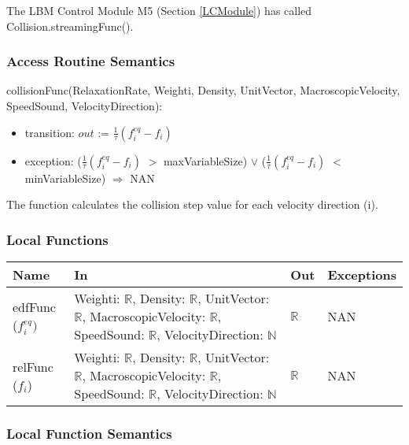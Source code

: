 \documentclass[12pt, titlepage]{article}
\begin{document}
The LBM Control Module M5 (Section \ref{LCModule}) has called Collision.streamingFunc().

\subsubsection{Access Routine Semantics}

\noindent collisionFunc(RelaxationRate, Weighti, Density, UnitVector, MacroscopicVelocity, SpeedSound, VelocityDirection):
\begin{itemize}
	\item transition: $out$ := $\frac{1}{\tau}(f_{i}^{eq}-f_{i})$
	\item exception: ($\frac{1}{\tau}(f_{i}^{eq}-f_{i})$ $>$ maxVariableSize) $\lor$ ($\frac{1}{\tau}(f_{i}^{eq}-f_{i})$ $<$ minVariableSize) $\Rightarrow$ NAN
\end{itemize}


The function calculates the collision step value for each velocity direction (i).

\subsubsection{Local Functions}

\begin{center}
	\begin{tabular}{p{2cm} p{3cm} p{4cm} p{2cm}}
		\hline
		\textbf{Name} & \textbf{In} & \textbf{Out} & \textbf{Exceptions} \\
		\hline
		edfFunc ($f_{i}^{eq})$ & Weighti: $\mathbb{R}$, Density: $\mathbb{R}$, UnitVector: $\mathbb{R}$, MacroscopicVelocity: $\mathbb{R}$, SpeedSound: $\mathbb{R}$, VelocityDirection: $\mathbb{N}$ & $\mathbb{R}$ & NAN \\
		relFunc ($f_{i}$) & Weighti: $\mathbb{R}$, Density: $\mathbb{R}$, UnitVector: $\mathbb{R}$, MacroscopicVelocity: $\mathbb{R}$, SpeedSound: $\mathbb{R}$, VelocityDirection: $\mathbb{N}$ & $\mathbb{R}$  & NAN \\
		\hline
	\end{tabular}
\end{center}

\subsubsection{Local Function Semantics}
\end{document}
